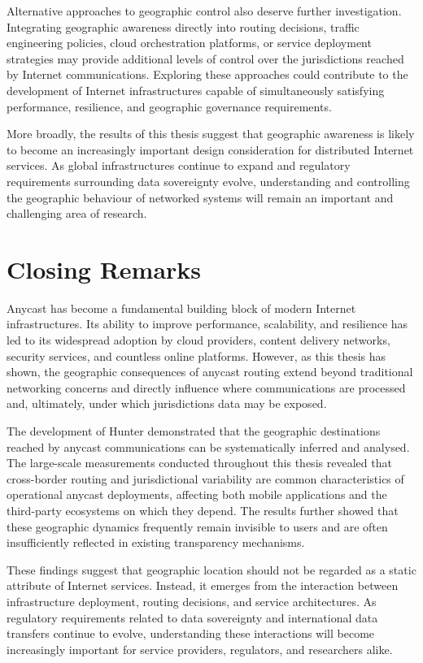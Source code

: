 Alternative approaches to geographic control also deserve further investigation. Integrating geographic awareness directly into routing decisions, traffic engineering policies, cloud orchestration platforms, or service deployment strategies may provide additional levels of control over the jurisdictions reached by Internet communications. Exploring these approaches could contribute to the development of Internet infrastructures capable of simultaneously satisfying performance, resilience, and geographic governance requirements.

More broadly, the results of this thesis suggest that geographic awareness is likely to become an increasingly important design consideration for distributed Internet services. As global infrastructures continue to expand and regulatory requirements surrounding data sovereignty evolve, understanding and controlling the geographic behaviour of networked systems will remain an important and challenging area of research.

\section{Closing Remarks}
\label{sc:conclusion_closing}

Anycast has become a fundamental building block of modern Internet infrastructures. Its ability to improve performance, scalability, and resilience has led to its widespread adoption by cloud providers, content delivery networks, security services, and countless online platforms. However, as this thesis has shown, the geographic consequences of anycast routing extend beyond traditional networking concerns and directly influence where communications are processed and, ultimately, under which jurisdictions data may be exposed.

The development of Hunter demonstrated that the geographic destinations reached by anycast communications can be systematically inferred and analysed. The large-scale measurements conducted throughout this thesis revealed that cross-border routing and jurisdictional variability are common characteristics of operational anycast deployments, affecting both mobile applications and the third-party ecosystems on which they depend. The results further showed that these geographic dynamics frequently remain invisible to users and are often insufficiently reflected in existing transparency mechanisms.

These findings suggest that geographic location should not be regarded as a static attribute of Internet services. Instead, it emerges from the interaction between infrastructure deployment, routing decisions, and service architectures. As regulatory requirements related to data sovereignty and international data transfers continue to evolve, understanding these interactions will become increasingly important for service providers, regulators, and researchers alike.

